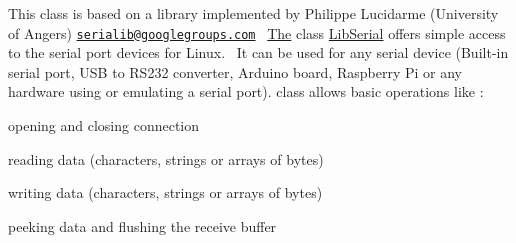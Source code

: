 This class is based on a library implemented by Philippe Lucidarme (University of Angers) \href{mailto:serialib@googlegroups.com}{\tt serialib@googlegroups.\+com}~\newline
\hyperlink{class_the}{The} class \hyperlink{class_lib_serial}{Lib\+Serial} offers simple access to the serial port devices for Linux.~\newline
It can be used for any serial device (Built-\/in serial port, U\+SB to R\+S232 converter, Arduino board, Raspberry Pi or any hardware using or emulating a serial port). class allows basic operations like \+:
\begin{DoxyItemize}
\item opening and closing connection
\item reading data (characters, strings or arrays of bytes)
\item writing data (characters, strings or arrays of bytes)
\item peeking data and flushing the receive buffer 
\end{DoxyItemize}